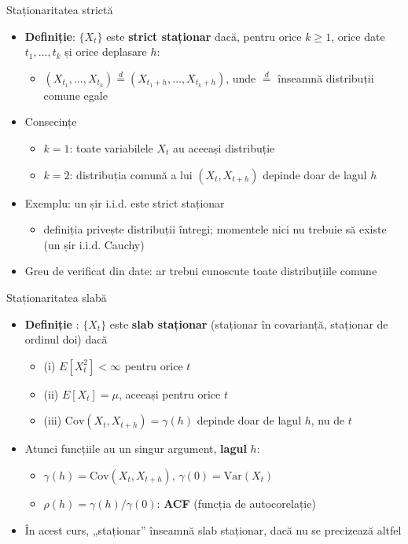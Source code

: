 \begin{frame}{Staționaritatea strictă}
\itemsize{\small}
\begin{itemize}
    \item \textbf{Definiție}: $\{X_t\}$ este \textbf{strict staționar} dacă, pentru orice $k \ge 1$, orice date $t_1, \dots, t_k$ și orice deplasare $h$:
    \begin{itemize}
        \item $(X_{t_1}, \dots, X_{t_k}) \overset{d}{=} (X_{t_1 + h}, \dots, X_{t_k + h})$, unde $\overset{d}{=}$ înseamnă distribuții comune egale
    \end{itemize}
    \item Consecințe
    \begin{itemize}
        \item $k = 1$: toate variabilele $X_t$ au aceeași distribuție
        \item $k = 2$: distribuția comună a lui $(X_t, X_{t+h})$ depinde doar de lagul $h$
    \end{itemize}
    \item Exemplu: un șir i.i.d. este strict staționar
    \begin{itemize}
        \item definiția privește distribuții întregi; momentele nici nu trebuie să existe (un șir i.i.d. Cauchy)
    \end{itemize}
    \item Greu de verificat din date: ar trebui cunoscute toate distribuțiile comune
\end{itemize}
\end{frame}

\begin{frame}{Staționaritatea slabă}
\itemsize{\small}
\begin{itemize}
    \item \textbf{Definiție} : $\{X_t\}$ este \textbf{slab staționar} (staționar în covarianță, staționar de ordinul doi) dacă
    \begin{itemize}
        \item (i) $E[X_t^2] < \infty$ pentru orice $t$
        \item (ii) $E[X_t] = \mu$, aceeași pentru orice $t$
        \item (iii) $\mathrm{Cov}(X_t, X_{t+h}) = \gamma(h)$ depinde doar de lagul $h$, nu de $t$
    \end{itemize}
    \item Atunci funcțiile au un singur argument, \textbf{lagul} $h$:
    \begin{itemize}
        \item $\gamma(h) = \mathrm{Cov}(X_t, X_{t+h})$, $\gamma(0) = \mathrm{Var}(X_t)$
        \item $\rho(h) = \gamma(h)/\gamma(0)$: \textbf{ACF} (funcția de autocorelație)
    \end{itemize}
    \item În acest curs, „staționar” înseamnă slab staționar, dacă nu se precizează altfel
\end{itemize}
\end{frame}

